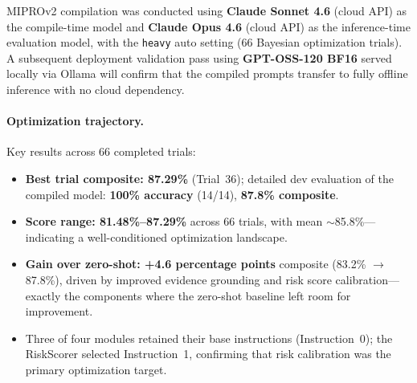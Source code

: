 \documentclass[11pt]{article}
\begin{document}
MIPROv2 compilation was conducted using \textbf{Claude Sonnet 4.6}
(cloud API) as the compile-time model and \textbf{Claude Opus 4.6}
(cloud API) as the inference-time evaluation model, with the
\texttt{heavy} auto setting (66 Bayesian optimization trials).
A subsequent deployment validation pass using \textbf{GPT-OSS-120
BF16} served locally via Ollama will confirm that the compiled prompts
transfer to fully offline inference with no cloud dependency.

\paragraph{Optimization trajectory.}
Key results across 66 completed trials:
\begin{itemize}[leftmargin=2em]
  \item \textbf{Best trial composite: 87.29\%} (Trial~36); detailed dev
    evaluation of the compiled model: \textbf{100\% accuracy} (14/14),
    \textbf{87.8\% composite}.
  \item \textbf{Score range: 81.48\%--87.29\%} across 66 trials,
    with mean $\sim$85.8\%---indicating a well-conditioned optimization
    landscape.
  \item \textbf{Gain over zero-shot: +4.6 percentage points} composite
    (83.2\% $\to$ 87.8\%), driven by improved evidence grounding and
    risk score calibration---exactly the components where the zero-shot
    baseline left room for improvement.
  \item Three of four modules retained their base instructions
    (Instruction~0); the RiskScorer selected Instruction~1, confirming
    that risk calibration was the primary optimization target.
\end{itemize}
\end{document}
